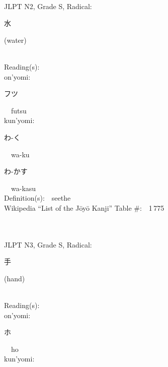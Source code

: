 \begin{multicols}{2}
{\fontsize{34pt}{40pt}  }\ \ \\  %
{JLPT N2, Grade S, Radical:\ \ {\begin{CJK}{UTF8}{min} 水 \end{CJK}} (water) } \\
Reading(s):\ \ \\
{\hspace*{1em}}on'yomi:\ \ \\
{\hspace*{2em}}{\begin{CJK}{UTF8}{min} フツ \end{CJK}}\ \ futsu\ \ \\
{\hspace*{1em}}kun'yomi:\ \ \\
{\hspace*{2em}}{\begin{CJK}{UTF8}{min} わ-く \end{CJK}}\ \ wa-ku\ \ \\
{\hspace*{2em}}{\begin{CJK}{UTF8}{min} わ-かす \end{CJK}}\ \ wa-kasu\ \ \\
Definition(s):\ \ seethe \\
Wikipedia ``List of the J\=oy\=o Kanji'' Table \#:\ \ 1\,775 \\
\ \ \\
{\fontsize{34pt}{40pt}  }\ \ \\  %
{JLPT N3, Grade S, Radical:\ \ {\begin{CJK}{UTF8}{min} 手 \end{CJK}} (hand) } \\
Reading(s):\ \ \\
{\hspace*{1em}}on'yomi:\ \ \\
{\hspace*{2em}}{\begin{CJK}{UTF8}{min} ホ \end{CJK}}\ \ ho\ \ \\
{\hspace*{1em}}kun'yomi:\ \ \\

\end{multicols}
